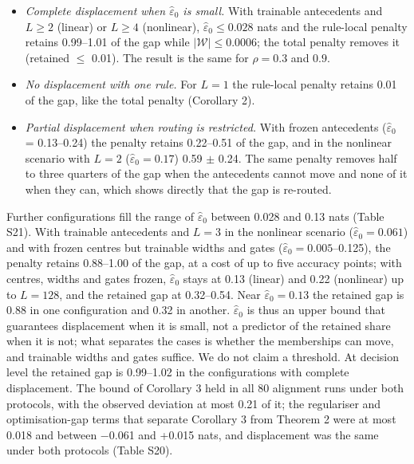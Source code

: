 \documentclass[pdflatex,sn-basic,Numbered,lineno]{sn-jnl}
\providecommand{\tightlist}{\setlength{\itemsep}{0pt}\setlength{\parskip}{0pt}}
\begin{document}
\begin{itemize}
\tightlist
\item
  \emph{Complete displacement when \(\hat\varepsilon_0\) is small.} With trainable antecedents and \(L \geq 2\) (linear) or \(L \geq 4\) (nonlinear), \(\hat\varepsilon_0 \leq 0.028\) nats and the rule-local penalty retains 0.99--1.01 of the gap while \(|\mathcal W| \leq 0.0006\); the total penalty removes it (retained \ensuremath{\le} 0.01). The result is the same for \(\rho = 0.3\) and \(0.9\).
\item
  \emph{No displacement with one rule.} For \(L = 1\) the rule-local penalty retains 0.01 of the gap, like the total penalty (Corollary 2).
\item
  \emph{Partial displacement when routing is restricted.} With frozen antecedents (\(\hat\varepsilon_0\) = 0.13--0.24) the penalty retains 0.22--0.51 of the gap, and in the nonlinear scenario with \(L = 2\) (\(\hat\varepsilon_0 = 0.17\)) 0.59 \ensuremath{\pm} 0.24. The same penalty removes half to three quarters of the gap when the antecedents cannot move and none of it when they can, which shows directly that the gap is re-routed.
\end{itemize}

Further configurations fill the range of \(\hat\varepsilon_0\) between 0.028 and 0.13 nats (Table S21). With trainable antecedents and \(L = 3\) in the nonlinear scenario (\(\hat\varepsilon_0 = 0.061\)) and with frozen centres but trainable widths and gates (\(\hat\varepsilon_0 = 0.005\)--0.125), the penalty retains 0.88--1.00 of the gap, at a cost of up to five accuracy points; with centres, widths and gates frozen, \(\hat\varepsilon_0\) stays at 0.13 (linear) and 0.22 (nonlinear) up to \(L = 128\), and the retained gap at 0.32--0.54. Near \(\hat\varepsilon_0 = 0.13\) the retained gap is 0.88 in one configuration and 0.32 in another. \(\hat\varepsilon_0\) is thus an upper bound that guarantees displacement when it is small, not a predictor of the retained share when it is not; what separates the cases is whether the memberships can move, and trainable widths and gates suffice. We do not claim a threshold. At decision level the retained gap is 0.99--1.02 in the configurations with complete displacement. The bound of Corollary 3 held in all 80 alignment runs under both protocols, with the observed deviation at most 0.21 of it; the regulariser and optimisation-gap terms that separate Corollary 3 from Theorem 2 were at most 0.018 and between \ensuremath{-}0.061 and +0.015 nats, and displacement was the same under both protocols (Table S20).
\end{document}
